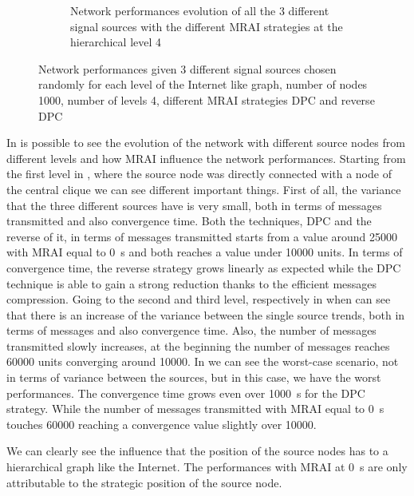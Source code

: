 \begin{figure}[h]
\begin{subfigure}[b]{0.45\textwidth}
		 \caption{Network performances evolution of all the \num{3} different signal sources
			with the different \ac{MRAI} strategies at the hierarchical level \num{4}}
         \label{fig:different_levels_4}
     \end{subfigure}
     \hfill
	 \caption{Network performances given \num{3} different signal sources chosen
		randomly for each level of the Internet like graph, number of nodes
		\num{1000}, number of levels \num{4}, different \ac{MRAI} strategies
		\ac{DPC} and reverse \ac{DPC} }
	 \label{fig:different_levels}
\end{figure}

In  is possible to see the evolution of the network
with different source nodes from different levels and how \ac{MRAI} influence
the network performances.
Starting from the first level in , where the source
node was directly connected with a node of the central clique we can see different
important things.
First of all, the variance that the three different sources have is very small,
both in terms of messages transmitted and also convergence time.
Both the techniques, \ac{DPC} and the reverse of it, in terms of messages
transmitted starts from a value around \num{25000} with \ac{MRAI} equal to
\SI{0}{\second} and both reaches a value under \num{10000} units.
In terms of convergence time, the reverse strategy grows linearly as expected
while the \ac{DPC} technique is able to gain a strong reduction thanks to
the efficient messages compression.
Going to the second and third level, respectively in
 when can see that there
is an increase of the variance between the single source trends, both in terms
of messages and also convergence time.
Also, the number of messages transmitted slowly increases, at the beginning the
number of messages reaches \num{60000} units converging around \num{10000}.
In  we can see the worst-case scenario, not in
terms of variance between the sources, but in this case, we have the worst
performances.
The convergence time grows even over \SI{1000}{\second} for the \ac{DPC} strategy.
While the number of messages transmitted with \ac{MRAI} equal to \SI{0}{\second}
touches \num{60000} reaching a convergence value slightly over \num{10000}.

We can clearly see the influence that the position of the source nodes has to
a hierarchical graph like the Internet.
The performances with \ac{MRAI} at \SI{0}{\second} are only attributable to the
strategic position of the source node.

